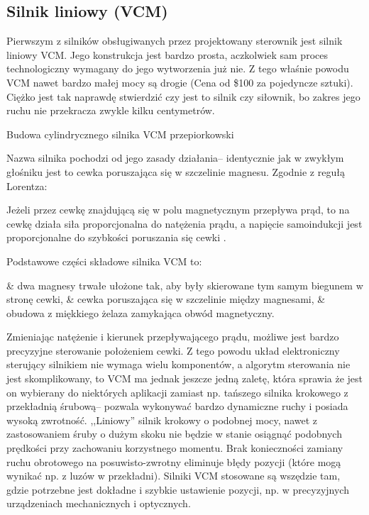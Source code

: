 \subsection{Silnik liniowy (VCM)}

Pierwszym z silników obsługiwanych przez projektowany sterownik jest silnik liniowy VCM. Jego konstrukcja jest bardzo prosta, aczkolwiek sam proces technologiczny wymagany do jego wytworzenia już nie. Z tego właśnie powodu VCM nawet bardzo małej mocy są drogie (Cena od \$100 za pojedyncze sztuki). Ciężko jest tak naprawdę stwierdzić czy jest to silnik czy siłownik, bo zakres jego ruchu nie przekracza zwykle kilku centymetrów.

	{Budowa cylindrycznego silnika VCM}
	{przepiorkowski}

Nazwa silnika pochodzi od jego zasady działania-- identycznie jak w zwykłym głośniku jest to cewka poruszająca się w szczelinie magnesu. Zgodnie z regułą Lorentza:

\begin{defn}
	Jeżeli przez cewkę znajdującą się w polu magnetycznym przepływa prąd, to na cewkę działa siła proporcjonalna do natężenia prądu, a napięcie samoindukcji jest proporcjonalne do szybkości poruszania się cewki \cite{przepiorkowski}.
\end{defn}

Podstawowe części składowe silnika VCM to:
\begin{easylist}
	& dwa magnesy trwałe ułożone tak, aby były skierowane tym samym biegunem w stronę cewki,
	& cewka poruszająca się w szczelinie między magnesami,
	& obudowa z miękkiego żelaza zamykająca obwód magnetyczny.
	\\
\end{easylist}

Zmieniając natężenie i kierunek przepływającego prądu, możliwe jest bardzo precyzyjne sterowanie położeniem cewki. Z tego powodu układ elektroniczny sterujący silnikiem nie wymaga wielu komponentów, a algorytm sterowania nie jest skomplikowany, to VCM ma jednak jeszcze jedną zaletę, która sprawia że jest on wybierany do niektórych aplikacji zamiast np. tańszego silnika krokowego z przekładnią śrubową-- pozwala wykonywać bardzo dynamiczne ruchy i posiada wysoką zwrotność. ,,Liniowy'' silnik krokowy o podobnej mocy, nawet z zastosowaniem śruby o dużym skoku nie będzie w stanie osiągnąć podobnych prędkości przy zachowaniu korzystnego momentu. Brak konieczności zamiany ruchu obrotowego na posuwisto-zwrotny eliminuje błędy pozycji (które mogą wynikać np. z luzów w przekładni). Silniki VCM stosowane są wszędzie tam, gdzie potrzebne jest dokładne i szybkie ustawienie pozycji, np. w precyzyjnych urządzeniach mechanicznych i optycznych. \\

